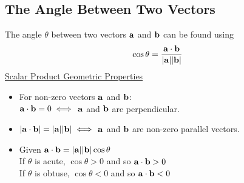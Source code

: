 \documentclass[10pt, a4paper, titlepage]{article}
\begin{document}
\begin{multicols*}{3}
	\dotfill
	\subsection{The Angle Between Two Vectors}
	The angle $\theta$ between two vectors $\vb{a}$ and $\vb{b}$ can be found using
	\begin{align}
		\cos{\theta}=\frac{\vb{a}\cdot\vb{b}}{|\vb{a}||\vb{b}|}
	\end{align}
	\underline{Scalar Product Geometric Properties}
	\begin{itemize}
		\item For non-zero vectors $\vb{a}$ and $\vb{b}$:\\ $\vb{a}\cdot\vb{b}=0\iff$ $\vb{a}$ and $\vb{b}$ are perpendicular.
		\item $|\vb{a}\cdot\vb{b}|=|\vb{a}||\vb{b}|\iff$ $\vb{a}$ and $\vb{b}$ are non-zero parallel vectors.
		\item Given $\vb{a}\cdot\vb{b}=|\vb{a}||\vb{b}|\cos{\theta}$\\ If $\theta$ is acute, $\cos{\theta}>0$ and so $\vb{a}\cdot\vb{b}>0$\\ If $\theta$ is obtuse, $\cos{\theta}<0$ and so $\vb{a}\cdot\vb{b}<0$
	\end{itemize}

	\dotfill

\end{multicols*}
\end{document}
